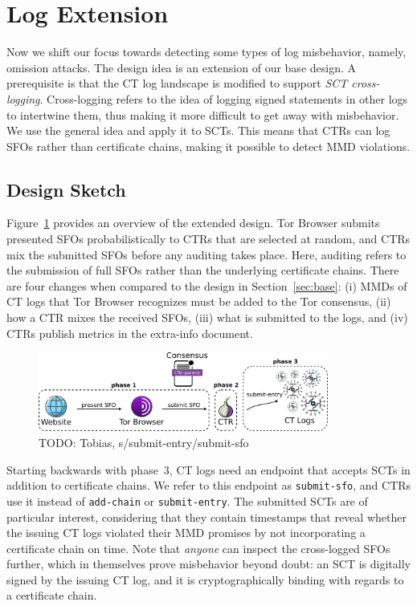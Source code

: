 \section{Log Extension} \label{sec:log}
Now we shift our focus towards detecting some types of log misbehavior, namely,
omission attacks.  The design idea is an
extension of our base design.  A prerequisite is that the CT log landscape
is modified to support \emph{SCT cross-logging}.  Cross-logging refers to the
idea of logging signed statements in other logs to intertwine
them, thus making it more difficult to get away with
misbehavior.  We use the general idea and apply it to SCTs.  This means that
CTRs can log SFOs rather than certificate chains, making it possible to detect
MMD violations.

\subsection{Design Sketch}
Figure~\ref{fig:ext-log} provides an overview of the extended design.  Tor
Browser submits presented SFOs probabilistically to CTRs that are selected
at random, and CTRs mix the submitted SFOs before any auditing takes place.
Here, auditing refers to the submission of full SFOs rather than the underlying
certificate chains.  There are four changes when compared to the design in
Section~\ref{sec:base}:
(i) MMDs of CT logs that Tor Browser recognizes must be added to the Tor
consensus,
(ii) how a CTR mixes the received SFOs,
(iii) what is submitted to the logs, and
(iv) CTRs publish metrics in the extra-info document.

\begin{figure}
    \centering
    \includegraphics[width=0.85\textwidth]{img/design-log}
	\caption{TODO: Tobias, s/submit-entry/submit-sfo}
    \label{fig:ext-log}
\end{figure}

Starting backwards with phase~3, CT logs need an endpoint that accepts SCTs in
addition to certificate chains.  We refer to this endpoint as
\texttt{submit-sfo}, and CTRs use it instead of \texttt{add-chain} or
\texttt{submit-entry}.  The submitted SCTs are of particular interest,
considering that they contain timestamps that reveal whether the issuing CT logs
violated their MMD promises by not incorporating a certificate chain on time.
Note that \emph{anyone} can inspect the cross-logged SFOs further, which in
themselves prove misbehavior beyond doubt:
	an SCT is digitally signed by the issuing CT log, and
	it is cryptographically binding with regards to a certificate chain.

